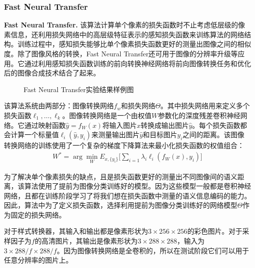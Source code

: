 
\subsubsection{Fast Neural Transfer}

\textbf{Fast Neural Transfer.}\cite{FNT} 该算法计算单个像素的损失函数时不止考虑低层级的像素信息，还利用损失网络中的高层级特征表示的感知损失函数来训练算法的网络结构。训练过程中，感知损失能够比单个像素损失函数更好的测量出图像之间的相似度。除了图像风格的转换，Fast Neural Transfer还可用于图像的分辨率升级等应用。它通过利用感知损失函数训练的前向转换神经网络将前向图像转换任务和优化后的图像合成技术结合了起来。

\begin{figure}[!bh]
    \centering
    \caption{Fast Neural Transfer实验结果样例图}
    \label{fnt-result}
\end{figure}

该算法系统由两部分：图像转换网络$f_w$和损失网络$\Theta$。其中损失网络用来定义多个损失函数$\ell_1,\dots,\ell_k$。图像转换网络是一个由权值$W$参数化的深度残差卷积神经网络。它通过映射函数$\hat{y}=f_W(x)$将输入图片$x$转换成输出图片$\hat{y}$。每个损失函数都会计算一个标量值$\ell_i(\hat{y},y_i)$来测量输出图片$\hat{y}$和目标图片$y_i$之间的距离。该图像转换网络的训练使用了一个复杂的梯度下降算法来最小化损失函数的权值组合：
\begin{align}
    W^*=\arg \min_W E_{x,\{y_i\}}\Big[\sum_{i=1}\lambda_i\ell_i(f_W(x),y_i)\Big]
\end{align}

为了解决单个像素损失的缺点，且是损失函数更好的测量出不同图像间的语义距离，该算法使用了提前为图像分类训练好的模型。因为这些模型一般都是卷积神经网络，且都在训练阶段学习了将我们想在损失函数中测量的语义信息编码的能力。因此，算法中为了定义损失函数，选择利用提前为图像分类训练好的网络模型$\Theta$作为固定的损失网络。

对于样式转换器，其输入和输出都是像素形状为$3\times 256 \times 256$的彩色图片。对于采样因子为$f$的高清图片，其输出是像素形状为$3\times288\times288$，输入为$3\times288/f\times288/f$。因为图像转换网络是全卷积的，所以在测试阶段它们可以用于任意分辨率的图片上。

